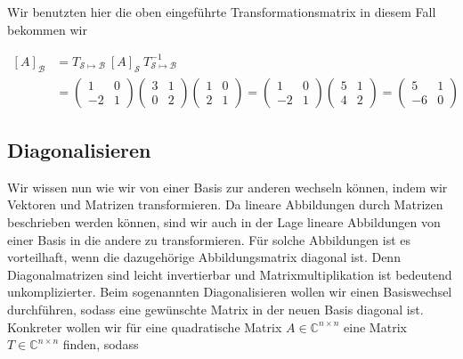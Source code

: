 \vspace{1\baselineskip}

Wir benutzten hier die oben eingeführte Transformationsmatrix in diesem Fall bekommen wir

\begin{equation*}
    \begin{aligned}
        [A]_\mathcal{B} &= T_{\mathcal{S} \mapsto \mathcal{B}} \ [A]_\mathcal{S} \ T_{\mathcal{S} \mapsto \mathcal{B}}^{-1} \\[1em]
        &= \begin{pmatrix} 1 & 0 \\ -2 & 1 \end{pmatrix} \begin{pmatrix} 3 & 1 \\ 0 & 2 \end{pmatrix} \begin{pmatrix} 1 & 0 \\ 2 & 1 \end{pmatrix} = \begin{pmatrix} 1 & 0 \\ -2 & 1 \end{pmatrix} \begin{pmatrix} 5 & 1 \\ 4 & 2 \end{pmatrix} = \begin{pmatrix} 5 & 1 \\ -6 & 0 \end{pmatrix}
    \end{aligned}
\end{equation*}

\subsection{Diagonalisieren}

Wir wissen nun wie wir von einer Basis zur anderen wechseln können, indem wir Vektoren und Matrizen transformieren. Da lineare Abbildungen durch Matrizen beschrieben werden können, sind wir auch in der Lage lineare Abbildungen von einer Basis in die andere zu transformieren. Für solche Abbildungen ist es vorteilhaft, wenn die dazugehörige Abbildungsmatrix diagonal ist. Denn Diagonalmatrizen sind leicht invertierbar und Matrixmultiplikation ist bedeutend unkomplizierter. Beim sogenannten Diagonalisieren wollen wir einen Basiswechsel durchführen, sodass eine gewünschte Matrix in der neuen Basis diagonal ist. Konkreter wollen wir für eine quadratische Matrix \( A \in \mathbb{C}^{n \times n} \) eine Matrix \( T \in \mathbb{C}^{n \times n} \) finden, sodass


